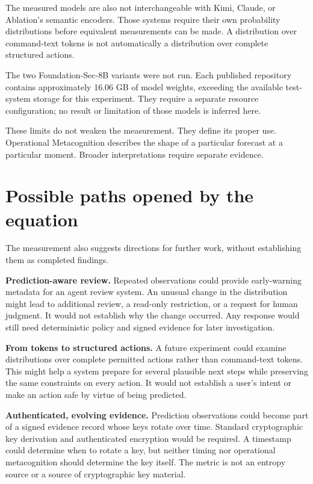 \documentclass[11pt,a4paper]{article}
\begin{document}
The measured models are also not interchangeable with Kimi, Claude, or Ablation's semantic encoders. Those systems require their own probability distributions before equivalent measurements can be made. A distribution over command-text tokens is not automatically a distribution over complete structured actions.

The two Foundation-Sec-8B variants were not run. Each published repository contains approximately 16.06 GB of model weights, exceeding the available test-system storage for this experiment. They require a separate resource configuration; no result or limitation of those models is inferred here.

These limits do not weaken the measurement. They define its proper use. Operational Metacognition describes the shape of a particular forecast at a particular moment. Broader interpretations require separate evidence.

\section{Possible paths opened by the equation}
The measurement also suggests directions for further work, without establishing them as completed findings.

\textbf{Prediction-aware review.} Repeated observations could provide early-warning metadata for an agent review system. An unusual change in the distribution might lead to additional review, a read-only restriction, or a request for human judgment. It would not establish why the change occurred. Any response would still need deterministic policy and signed evidence for later investigation.

\textbf{From tokens to structured actions.} A future experiment could examine distributions over complete permitted actions rather than command-text tokens. This might help a system prepare for several plausible next steps while preserving the same constraints on every action. It would not establish a user's intent or make an action safe by virtue of being predicted.

\textbf{Authenticated, evolving evidence.} Prediction observations could become part of a signed evidence record whose keys rotate over time. Standard cryptographic key derivation and authenticated encryption would be required. A timestamp could determine when to rotate a key, but neither timing nor operational metacognition should determine the key itself. The metric is not an entropy source or a source of cryptographic key material.
\end{document}
